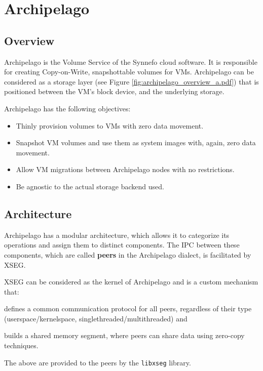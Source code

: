 \chapter{Archipelago}\label{ch:archip}

\section{Overview}

Archipelago is the Volume Service of the Synnefo cloud software. It is 
responsible for creating Copy-on-Write, snapshottable volumes for VMs.  
Archipelago can be considered as a storage layer (see Figure 
\ref{fig:archipelago_overview_a.pdf}) that is positioned between the VM's block 
device, and the underlying storage.


Archipelago has the following objectives:

\begin{itemize}
	\item Thinly provision volumes to VMs with zero data movement.
	\item Snapshot VM volumes and use them as system images with, again, zero 
		data movement.
	\item Allow VM migrations between Archipelago nodes with no restrictions.
	\item Be agnostic to the actual storage backend used.
\end{itemize}

\section{Architecture}

Archipelago has a modular architecture, which allows it to categorize its 
operations and assign them to distinct components. The IPC between these 
components, which are called \textbf{peers} in the Archipelago dialect, is 
facilitated by XSEG.

XSEG can be considered as the kernel of Archipelago and is a custom mechanism 
that:
\begin{inparaenum}[i)]
\item defines a common communication protocol for all peers, regardless of 
	their type (userspace/kernelspace, singlethreaded/multithreaded) and
\item builds a shared memory segment, where peers can share data using 
	zero-copy techniques.
\end{inparaenum}
The above are provided to the peers by the \texttt{libxseg} library.

